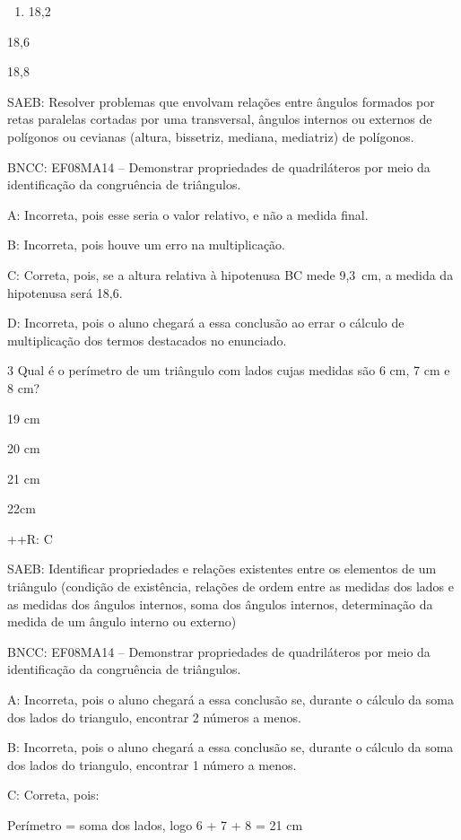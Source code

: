 {\begin{enumerate}
\def\labelenumi{\alph{enumi})}
\setcounter{enumi}{1}
\tightlist
\item
  18,2
\end{enumerate}
\item 18,6
\item 18,8

SAEB: Resolver problemas que envolvam relações entre ângulos formados
por retas paralelas cortadas por uma transversal, ângulos internos ou
externos de polígonos ou cevianas (altura, bissetriz, mediana,
mediatriz) de polígonos.

BNCC: EF08MA14 -- Demonstrar propriedades de quadriláteros por meio da
identificação da congruência de triângulos.

A: Incorreta, pois esse seria o valor relativo, e não a medida final.

B: Incorreta, pois houve um erro na multiplicação.

C: Correta, pois, se a altura relativa à hipotenusa BC mede 9,3~cm, a
medida da hipotenusa será 18,6.

D: Incorreta, pois o aluno chegará a essa conclusão ao errar o cálculo
de multiplicação dos termos destacados no enunciado.

\num{3} Qual é o perímetro de um triângulo com lados cujas medidas são 6 cm,
7 cm e 8 cm?
\item 19 cm
\item 20 cm
\item 21 cm
\item 22cm

++R: C

SAEB: Identificar propriedades e relações existentes entre os elementos
de um triângulo (condição de existência, relações de ordem entre as
medidas dos lados e as medidas dos ângulos internos, soma dos ângulos
internos, determinação da medida de um ângulo interno ou externo)

BNCC: EF08MA14 -- Demonstrar propriedades de quadriláteros por meio da
identificação da congruência de triângulos.

A: Incorreta, pois o aluno chegará a essa conclusão se, durante o
cálculo da soma dos lados do triangulo, encontrar 2 números a menos.

B: Incorreta, pois o aluno chegará a essa conclusão se, durante o
cálculo da soma dos lados do triangulo, encontrar 1 número a menos.

C: Correta, pois:

Perímetro = soma dos lados, logo 6 + 7 + 8 = 21 cm

}
